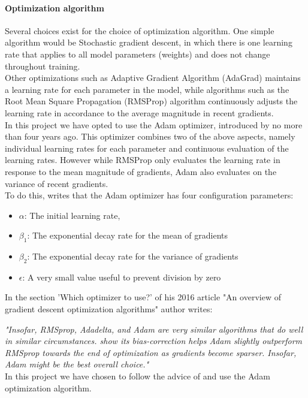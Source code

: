 \begin{multicols}{2}
\paragraph{Optimization algorithm}
Several choices exist for the choice of optimization algorithm. One simple algorithm would be Stochastic gradient descent, in which there is one learning rate that applies to all model parameters (weights) and does not change throughout training.\\
Other optimizations such as Adaptive Gradient Algorithm (AdaGrad) maintains a learning rate for each parameter in the model, while algorithms such as the Root Mean Square Propagation (RMSProp) algorithm continuously adjusts the learning rate in accordance to the average magnitude in recent gradients.\\
In this project we have opted to use the Adam optimizer, introduced by \citeauthor{Adam} no more than four years ago. This optimizer combines two of the above aspects, namely individual learning rates for each parameter and continuous evaluation of the learning rates. However while RMSProp only evaluates the learning rate in response to the mean magnitude of gradients, Adam also evaluates on the variance of recent gradients.\\
To do this, \citeauthor{Adam} writes that the Adam optimizer has four configuration parameters: 
\begin{itemize}
\item $\alpha$: The initial learning rate,
\item $\beta_1$: The exponential decay rate for the mean of gradients
\item $\beta_2$: The exponential decay rate for the variance of gradients
\item $\epsilon$: A very small value useful to prevent division by zero
\end{itemize}
In the section 'Which optimizer to use?' of his 2016 article "An overview of gradient descent optimization algorithms" author \citeauthor{Ruder16} writes:

\textit{"Insofar, RMSprop, Adadelta, and Adam are very similar algorithms that do well in similar circumstances. \citeauthor{Adam} show its bias-correction helps Adam slightly outperform RMSprop towards the end of optimization as gradients become sparser. Insofar, Adam might be the best overall choice."}\\
In this project we have chosen to follow the advice of \citeauthor{Ruder16} and use the Adam optimization algorithm.


\end{multicols}
